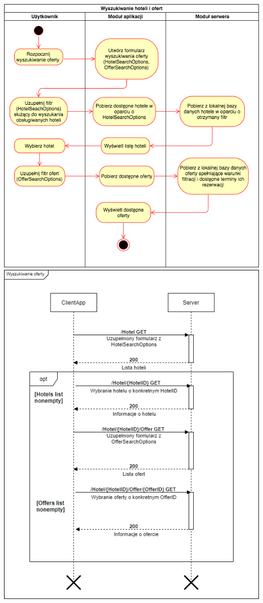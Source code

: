 \documentclass{article}
\begin{document}
\begin{center}
    \includegraphics[scale=0.65]{Aktywnosc/IO_Aktywności-Wyszukiwanie hoteli i ofert.png} \newpage
    \includegraphics[scale=0.65]{Sekwencje/Offer_Search.png}
\end{center}
\end{document}
